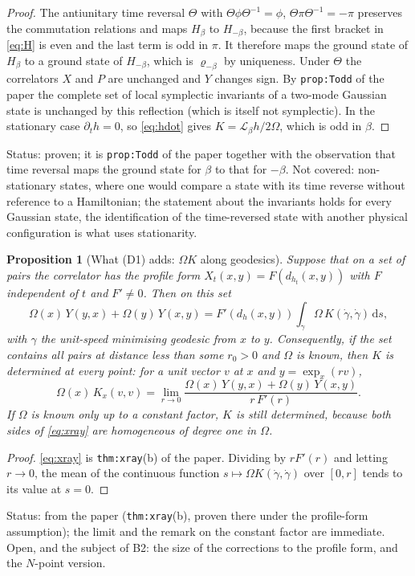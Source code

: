 \documentclass[a4paper,11pt]{article}
\newtheorem{proposition}[theorem]{Proposition}
\theoremstyle{definition}
\theoremstyle{remark}
\newcommand{\dd}{\mathrm{d}}
\newcommand{\Lie}{\mathcal{L}}
\newcommand{\status}[1]{\par\noindent\textsf{\small Status: #1}\par}
\begin{document}
\begin{proof}
The antiunitary time reversal $\Theta$ with $\Theta\phi\Theta^{-1}=\phi$, $\Theta\pi\Theta^{-1}=-\pi$ preserves the commutation relations and maps $H_\beta$ to $H_{-\beta}$, because the first bracket in \eqref{eq:H} is even and the last term is odd in $\pi$. It therefore maps the ground state of $H_\beta$ to a ground state of $H_{-\beta}$, which is $\varrho_{-\beta}$ by uniqueness. Under $\Theta$ the correlators $X$ and $P$ are unchanged and $Y$ changes sign. By \texttt{prop:Todd} of the paper the complete set of local symplectic invariants of a two-mode Gaussian state is unchanged by this reflection (which is itself not symplectic). In the stationary case $\partial_th=0$, so \eqref{eq:hdot} gives $K=\Lie_\beta h/2\Omega$, which is odd in $\beta$.
\end{proof}
\status{proven; it is \texttt{prop:Todd} of the paper together with the observation that time reversal maps the ground state for $\beta$ to that for $-\beta$. Not covered: non-stationary states, where one would compare a state with its time reverse without reference to a Hamiltonian; the statement about the invariants holds for every Gaussian state, the identification of the time-reversed state with another physical configuration is what uses stationarity.}

\begin{proposition}[What \textup{(D1)} adds: $\Omega K$ along geodesics]\label{prop:D1}
Suppose that on a set of pairs the correlator has the profile form $X_t(x,y)=F(d_{h_t}(x,y))$ with $F$ independent of $t$ and $F'\ne0$. Then on this set
\begin{equation}\label{eq:xray}
\Omega(x)\,Y(y,x)+\Omega(y)\,Y(x,y)=F'(d_h(x,y))\int_\gamma\Omega\,K(\dot\gamma,\dot\gamma)\,\dd s ,
\end{equation}
with $\gamma$ the unit-speed minimising geodesic from $x$ to $y$. Consequently, if the set contains all pairs at distance less than some $r_0>0$ and $\Omega$ is known, then $K$ is determined at every point: for a unit vector $v$ at $x$ and $y=\exp_x(rv)$,
\[
\Omega(x)\,K_x(v,v)=\lim_{r\to0}\frac{\Omega(x)\,Y(y,x)+\Omega(y)\,Y(x,y)}{r\,F'(r)} .
\]
If $\Omega$ is known only up to a constant factor, $K$ is still determined, because both sides of \eqref{eq:xray} are homogeneous of degree one in $\Omega$.
\end{proposition}

\begin{proof}
\eqref{eq:xray} is \texttt{thm:xray}(b) of the paper. Dividing by $rF'(r)$ and letting $r\to0$, the mean of the continuous function $s\mapsto\Omega K(\dot\gamma,\dot\gamma)$ over $[0,r]$ tends to its value at $s=0$.
\end{proof}
\status{from the paper (\texttt{thm:xray}(b), proven there under the profile-form assumption); the limit and the remark on the constant factor are immediate. Open, and the subject of B2: the size of the corrections to the profile form, and the $N$-point version.}
\end{document}
